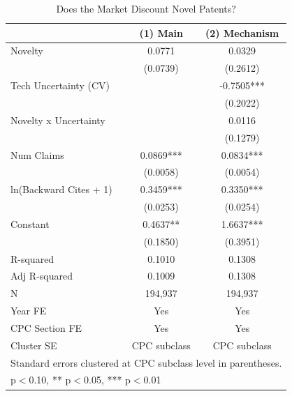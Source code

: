 \begin{table}[htbp]
\centering
\caption{Does the Market Discount Novel Patents?}
\label{tab:main_regression}
\begin{tabular}{lcc}
\hline\hline
 & (1) Main & (2) Mechanism \\
\hline
Novelty & 0.0771 & 0.0329 \\
 & (0.0739) & (0.2612) \\
Tech Uncertainty (CV) &  & -0.7505*** \\
 &  & (0.2022) \\
Novelty x Uncertainty &  & 0.0116 \\
 &  & (0.1279) \\
Num Claims & 0.0869*** & 0.0834*** \\
 & (0.0058) & (0.0054) \\
ln(Backward Cites + 1) & 0.3459*** & 0.3350*** \\
 & (0.0253) & (0.0254) \\
Constant & 0.4637** & 1.6637*** \\
 & (0.1850) & (0.3951) \\
\hline
R-squared & 0.1010 & 0.1308 \\
Adj R-squared & 0.1009 & 0.1308 \\
N & 194,937 & 194,937 \\
Year FE & Yes & Yes \\
CPC Section FE & Yes & Yes \\
Cluster SE & CPC subclass & CPC subclass \\
\hline\hline
\multicolumn{3}{l}{\footnotesize Standard errors clustered at CPC subclass level in parentheses.} \\
\multicolumn{3}{l}{\footnotesize * p$<$0.10, ** p$<$0.05, *** p$<$0.01} \\
\end{tabular}
\end{table}